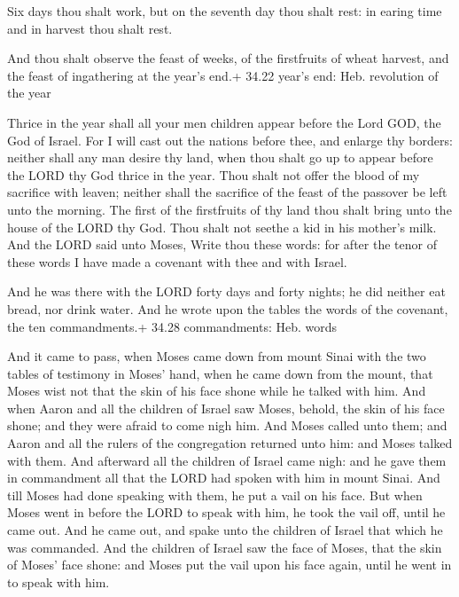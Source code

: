  Six days thou shalt work, but on the seventh day thou
shalt rest: in earing time and in harvest thou shalt rest.

 And thou shalt observe the feast of weeks, of the
firstfruits of wheat harvest, and the feast of ingathering at the year's
end.+ 34.22 year's end: Heb. revolution of the year

 Thrice in the year shall all your men children appear
before the Lord GOD, the God of Israel.  For I will cast
out the nations before thee, and enlarge thy borders: neither shall any
man desire thy land, when thou shalt go up to appear before the LORD thy
God thrice in the year.  Thou shalt not offer the blood of
my sacrifice with leaven; neither shall the sacrifice of the feast of
the passover be left unto the morning.  The first of the
firstfruits of thy land thou shalt bring unto the house of the LORD thy
God. Thou shalt not seethe a kid in his mother's milk.  And
the LORD said unto Moses, Write thou these words: for after the tenor of
these words I have made a covenant with thee and with Israel.

 And he was there with the LORD forty days and forty
nights; he did neither eat bread, nor drink water. And he wrote upon the
tables the words of the covenant, the ten commandments.+ 34.28
commandments: Heb. words

 And it came to pass, when Moses came down from mount
Sinai with the two tables of testimony in Moses' hand, when he came down
from the mount, that Moses wist not that the skin of his face shone
while he talked with him.  And when Aaron and all the
children of Israel saw Moses, behold, the skin of his face shone; and
they were afraid to come nigh him.  And Moses called unto
them; and Aaron and all the rulers of the congregation returned unto
him: and Moses talked with them.  And afterward all the
children of Israel came nigh: and he gave them in commandment all that
the LORD had spoken with him in mount Sinai.  And till
Moses had done speaking with them, he put a vail on his face.
 But when Moses went in before the LORD to speak with him,
he took the vail off, until he came out. And he came out, and spake unto
the children of Israel that which he was commanded.  And
the children of Israel saw the face of Moses, that the skin of Moses'
face shone: and Moses put the vail upon his face again, until he went in
to speak with him.

